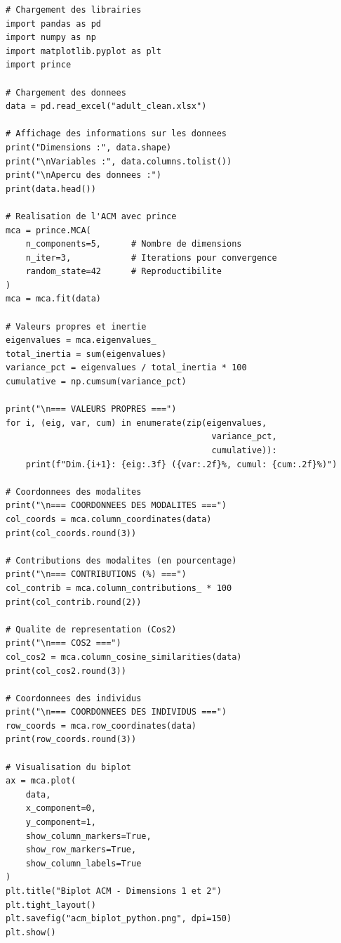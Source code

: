 \documentclass[12pt,a4paper]{article}
\begin{document}
\begin{lstlisting}[style=Pythonstyle, caption={Code Python pour l'ACM avec prince}]
# Chargement des librairies
import pandas as pd
import numpy as np
import matplotlib.pyplot as plt
import prince

# Chargement des donnees
data = pd.read_excel("adult_clean.xlsx")

# Affichage des informations sur les donnees
print("Dimensions :", data.shape)
print("\nVariables :", data.columns.tolist())
print("\nApercu des donnees :")
print(data.head())

# Realisation de l'ACM avec prince
mca = prince.MCA(
    n_components=5,      # Nombre de dimensions
    n_iter=3,            # Iterations pour convergence
    random_state=42      # Reproductibilite
)
mca = mca.fit(data)

# Valeurs propres et inertie
eigenvalues = mca.eigenvalues_
total_inertia = sum(eigenvalues)
variance_pct = eigenvalues / total_inertia * 100
cumulative = np.cumsum(variance_pct)

print("\n=== VALEURS PROPRES ===")
for i, (eig, var, cum) in enumerate(zip(eigenvalues, 
                                         variance_pct, 
                                         cumulative)):
    print(f"Dim.{i+1}: {eig:.3f} ({var:.2f}%, cumul: {cum:.2f}%)")

# Coordonnees des modalites
print("\n=== COORDONNEES DES MODALITES ===")
col_coords = mca.column_coordinates(data)
print(col_coords.round(3))

# Contributions des modalites (en pourcentage)
print("\n=== CONTRIBUTIONS (%) ===")
col_contrib = mca.column_contributions_ * 100
print(col_contrib.round(2))

# Qualite de representation (Cos2)
print("\n=== COS2 ===")
col_cos2 = mca.column_cosine_similarities(data)
print(col_cos2.round(3))

# Coordonnees des individus
print("\n=== COORDONNEES DES INDIVIDUS ===")
row_coords = mca.row_coordinates(data)
print(row_coords.round(3))

# Visualisation du biplot
ax = mca.plot(
    data,
    x_component=0,
    y_component=1,
    show_column_markers=True,
    show_row_markers=True,
    show_column_labels=True
)
plt.title("Biplot ACM - Dimensions 1 et 2")
plt.tight_layout()
plt.savefig("acm_biplot_python.png", dpi=150)
plt.show()
\end{lstlisting}

\end{document}

